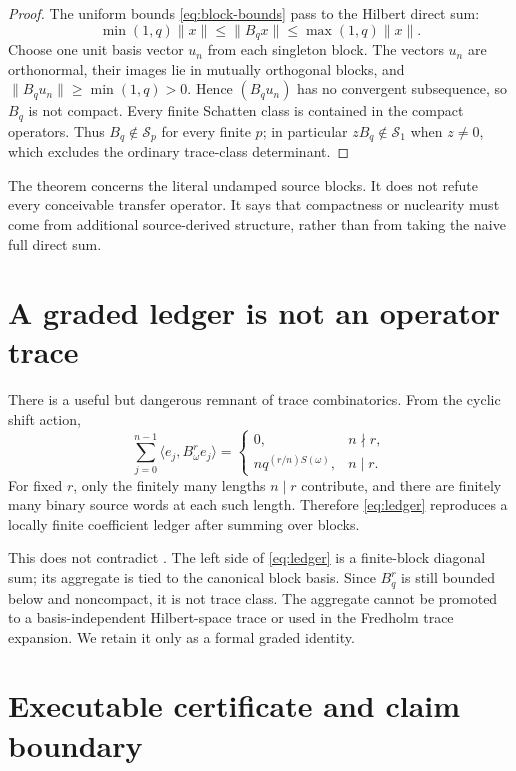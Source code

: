 \documentclass[11pt]{article}
\newcommand{\Sch}{\mathcal S_1}
\begin{document}
\begin{proof}
The uniform bounds \eqref{eq:block-bounds} pass to the Hilbert direct sum:
\[
 \min(1,q)\|x\|\leq\|B_qx\|\leq\max(1,q)\|x\|.
\]
Choose one unit basis vector $u_n$ from each singleton block.  The vectors
$u_n$ are orthonormal, their images lie in mutually orthogonal blocks, and
$\|B_qu_n\|\geq\min(1,q)>0$.  Hence $(B_qu_n)$ has no convergent subsequence,
so $B_q$ is not compact.  Every finite Schatten class is contained in the
compact operators.  Thus $B_q\notin\mathcal S_p$ for every finite $p$; in
particular $zB_q\notin\Sch$ when $z\ne0$, which excludes the ordinary
trace-class determinant.
\end{proof}

The theorem concerns the literal undamped source blocks.  It does not refute
every conceivable transfer operator.  It says that compactness or
nuclearity must come from additional source-derived structure, rather than
from taking the naive full direct sum.

\section{A graded ledger is not an operator trace}

There is a useful but dangerous remnant of trace combinatorics.  From the
cyclic shift action,
\begin{equation}\label{eq:ledger}
 \sum_{j=0}^{n-1}\langle e_j,B_\omega^re_j\rangle=
 \begin{cases}
 0,&n\nmid r,\\
 nq^{(r/n)S(\omega)},&n\mid r.
 \end{cases}
\end{equation}
For fixed $r$, only the finitely many lengths $n\mid r$ contribute, and
there are finitely many binary source words at each such length.  Therefore
\eqref{eq:ledger} reproduces a locally finite coefficient ledger after
summing over blocks.

This does not contradict .  The left side of
\eqref{eq:ledger} is a finite-block diagonal sum; its aggregate is tied to
the canonical block basis.  Since $B_q^r$ is still bounded below and
noncompact, it is not trace class.  The aggregate cannot be promoted to a
basis-independent Hilbert-space trace or used in the Fredholm trace
expansion.  We retain it only as a formal graded identity.

\section{Executable certificate and claim boundary}
\end{document}
